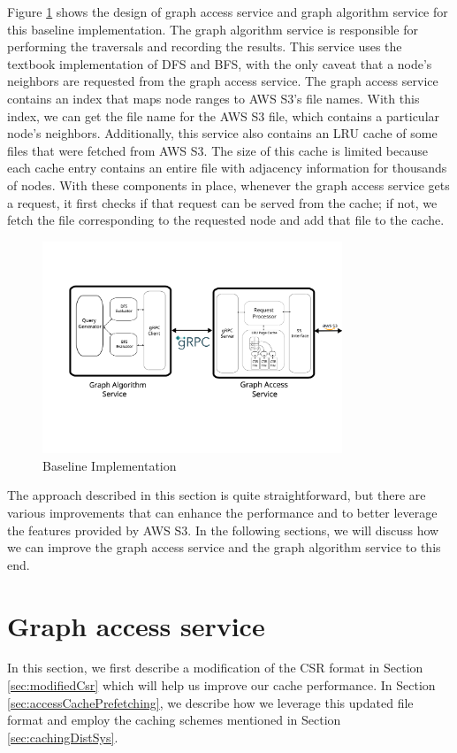 \medskip
Figure \ref{fig:baselineImpl} shows the design of graph access service and graph
algorithm service for this baseline implementation. The graph algorithm service
is responsible for performing the traversals and recording the results. This
service uses the textbook implementation of DFS and BFS, with the only caveat
that a node's neighbors are requested from the graph access service. The graph
access service contains an index that maps node ranges to AWS S3's file names. With
this index, we can get the file name for the AWS S3 file, which contains a particular
node's neighbors. Additionally, this service also contains an LRU cache of some
files that were fetched from AWS S3. The size of this cache is limited because each
cache entry contains an entire file with adjacency information for
thousands of nodes. With these components in place, whenever the graph access
service gets a request, it first checks if that request can be served from the
cache; if not, we fetch the file corresponding to the requested node and add
that file to the cache.
\begin{figure}[ht]
    \centering
    \includegraphics[width=0.8\textwidth]{figures/baseline.png}
    \caption{Baseline Implementation}
    \label{fig:baselineImpl}
\end{figure}

\medskip
The approach described in this section is quite straightforward, but there are
various improvements that can enhance the performance and to better 
leverage the features provided by AWS S3. In the following sections, we will
discuss how we can improve the graph access service
and the graph algorithm service to this end. 

\section{Graph access service}\label{sec:graphAccess}
In this section, we first describe a modification of the CSR format in
Section \ref{sec:modifiedCsr} which will help us improve our cache performance.
In Section \ref{sec:accessCachePrefetching}, we describe how we leverage
this updated file format and employ the caching schemes mentioned in
Section \ref{sec:cachingDistSys}.

